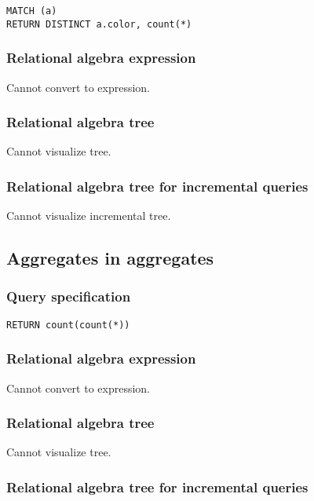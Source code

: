 \begin{lstlisting}
MATCH (a)
RETURN DISTINCT a.color, count(*)
\end{lstlisting}

\subsubsection*{Relational algebra expression}

Cannot convert to expression.

\subsubsection*{Relational algebra tree}

Cannot visualize tree.

\subsubsection*{Relational algebra tree for incremental queries}

Cannot visualize incremental tree.

\subsection{Aggregates in aggregates}

\subsubsection*{Query specification}

\begin{lstlisting}
RETURN count(count(*))
\end{lstlisting}

\subsubsection*{Relational algebra expression}

Cannot convert to expression.

\subsubsection*{Relational algebra tree}

Cannot visualize tree.

\subsubsection*{Relational algebra tree for incremental queries}

